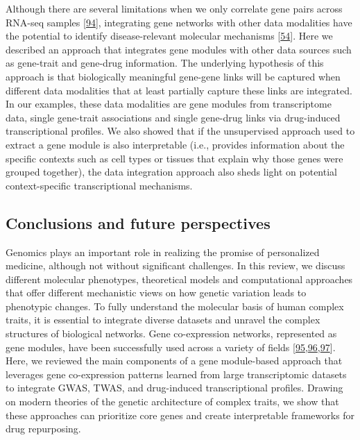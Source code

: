Although there are several limitations when we only correlate gene pairs across RNA-seq samples {[}\protect\hyperlink{ref-jVQ2rMqc}{94}{]}, integrating gene networks with other data modalities have the potential to identify disease-relevant molecular mechanisms {[}\protect\hyperlink{ref-dg9nKuy0}{54}{]}.
Here we described an approach that integrates gene modules with other data sources such as gene-trait and gene-drug information.
The underlying hypothesis of this approach is that biologically meaningful gene-gene links will be captured when different data modalities that at least partially capture these links are integrated.
In our examples, these data modalities are gene modules from transcriptome data, single gene-trait associations and single gene-drug links via drug-induced transcriptional profiles.
We also showed that if the unsupervised approach used to extract a gene module is also interpretable (i.e., provides information about the specific contexts such as cell types or tissues that explain why those genes were grouped together), the data integration approach also sheds light on potential context-specific transcriptional mechanisms.

\hypertarget{conclusions-and-future-perspectives}{%
\subsection{Conclusions and future perspectives}\label{conclusions-and-future-perspectives}}

Genomics plays an important role in realizing the promise of personalized medicine, although not without significant challenges.
In this review, we discuss different molecular phenotypes, theoretical models and computational approaches that offer different mechanistic views on how genetic variation leads to phenotypic changes.
To fully understand the molecular basis of human complex traits, it is essential to integrate diverse datasets and unravel the complex structures of biological networks.
Gene co-expression networks, represented as gene modules, have been successfully used across a variety of fields {[}\protect\hyperlink{ref-CqvNaEqc}{95},\protect\hyperlink{ref-r8alvfcC}{96},\protect\hyperlink{ref-E1tpJnqG}{97}{]}.
Here, we reviewed the main components of a gene module-based approach that leverages gene co-expression patterns learned from large transcriptomic datasets to integrate GWAS, TWAS, and drug-induced transcriptional profiles.
Drawing on modern theories of the genetic architecture of complex traits, we show that these approaches can prioritize core genes and create interpretable frameworks for drug repurposing.

